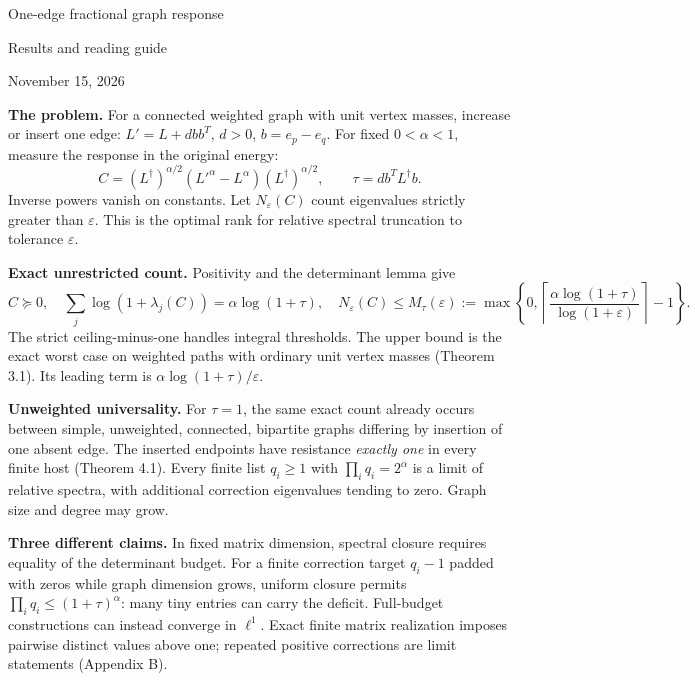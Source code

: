 \documentclass[11pt]{article}
\begin{document}
\begin{center}
{\Large One-edge fractional graph response}\par\vspace{3pt}
{\large Results and reading guide}\par\vspace{3pt}
November 15, 2026
\end{center}

\textbf{The problem.}
For a connected weighted graph with unit vertex masses, increase or
insert one edge: $L'=L+d bb^T$, $d>0$, $b=e_p-e_q$.
For fixed $0<\alpha<1$, measure the response in the original energy:
\[
 C=(L^\dagger)^{\alpha/2}(L'^\alpha-L^\alpha)(L^\dagger)^{\alpha/2},
 \qquad \tau=d b^TL^\dagger b.
\]
Inverse powers vanish on constants. Let $N_\varepsilon(C)$ count
eigenvalues strictly greater than $\varepsilon$. This is the optimal
rank for relative spectral truncation to tolerance $\varepsilon$.

\textbf{Exact unrestricted count.}
Positivity and the determinant lemma give
\[
 C\succeq0,\quad
 \sum_j\log(1+\lambda_j(C))=\alpha\log(1+\tau),\quad
 N_\varepsilon(C)\le
 M_\tau(\varepsilon):=
 \max\left\{0,\left\lceil
 \frac{\alpha\log(1+\tau)}{\log(1+\varepsilon)}
 \right\rceil-1\right\}.
\]
The strict ceiling-minus-one handles integral thresholds. The upper
bound is the exact worst case on weighted paths with ordinary unit
vertex masses (Theorem 3.1). Its leading term is
$\alpha\log(1+\tau)/\varepsilon$.

\textbf{Unweighted universality.}
For $\tau=1$, the same exact count already occurs between simple,
unweighted, connected, bipartite graphs differing by insertion of one
absent edge. The inserted endpoints have resistance \emph{exactly one}
in every finite host (Theorem 4.1). Every finite list $q_i\ge1$ with
$\prod_iq_i=2^\alpha$ is a limit of relative spectra, with additional
correction eigenvalues tending to zero. Graph size and degree may grow.

\textbf{Three different claims.}
In fixed matrix dimension, spectral closure requires equality of the
determinant budget. For a finite correction target $q_i-1$ padded with zeros while graph
dimension grows, uniform closure permits $\prod_iq_i\le(1+\tau)^\alpha$:
many tiny entries can carry the deficit. Full-budget constructions can
instead converge in $\ell^1$. Exact finite matrix realization imposes
pairwise distinct values above one; repeated positive corrections are
limit statements (Appendix B).
\end{document}
